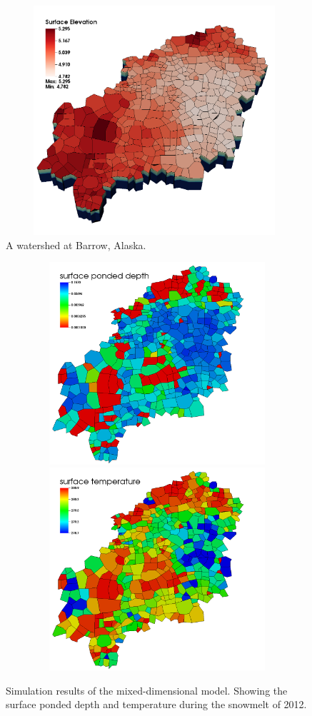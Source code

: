 \documentclass[review]{elsarticle}
\begin{document}
\begin{figure}[!htpb]
\centering
\includegraphics[height = 8.5cm, width=11cm]{figures/barrow-watershed-image-3.png}
\caption{A watershed at Barrow, Alaska.}
\label{barrow-468}
\end{figure}
 
 \begin{figure}[!htpb]
\centering
\includegraphics[height = 7.5cm, width=12cm]{figures/surface-ponded-depth3-time13-4507.png} \\
\includegraphics[height = 7.5cm, width=12cm]{figures/surface-temperature3-time13-4644.png}
\caption{Simulation results of the mixed-dimensional model. Showing the surface ponded depth and temperature during the snowmelt of 2012.}
\label{barrow-pd-temp}
\end{figure}
\end{document}
